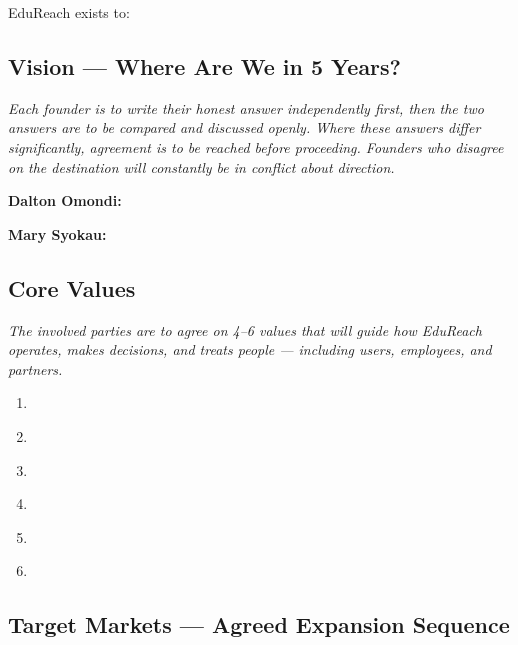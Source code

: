 \documentclass[12pt,a4paper]{article}
\newcommand{\blank}[1][5.5cm]{\underline{\hspace{#1}}}
\begin{document}
\noindent EduReach exists to: \blank[10cm]

\medskip
\noindent \blank[14cm]

\subsection{Vision --- Where Are We in 5 Years?}

\begin{notebox}
\textit{Each founder is to write their honest answer independently first, then the two answers are to be compared and discussed openly. Where these answers differ significantly, agreement is to be reached before proceeding. Founders who disagree on the destination will constantly be in conflict about direction.}
\end{notebox}

\noindent\textbf{Dalton Omondi:} \blank[11cm]\\[0.5em]
\noindent{}\blank[11cm]

\medskip
\noindent\textbf{Mary Syokau:} \blank[11.3cm]\\[0.5em]
\noindent{}\blank[11.3cm]

\subsection{Core Values}

\begin{notebox}
\textit{The involved parties are to agree on 4--6 values that will guide how EduReach operates, makes decisions, and treats people --- including users, employees, and partners.}
\end{notebox}

\begin{enumerate}
  \item \blank[10cm]
  \item \blank[10cm]
  \item \blank[10cm]
  \item \blank[10cm]
  \item \blank[10cm]
  \item \blank[10cm]
\end{enumerate}

\subsection{Target Markets --- Agreed Expansion Sequence}
\end{document}
